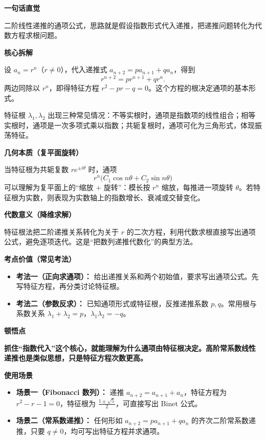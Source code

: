 \begin{explanationbox}
	\textbf{\textcolor{CExplanation}{一句话直觉}}

	二阶线性递推的通项公式，思路就是假设指数形式代入递推，把递推问题转化为代数方程求根问题。

	\medskip
	\textbf{\textcolor{CExplanation}{核心拆解}}
	\begin{description}[style=nextline, leftmargin=2.8em, labelsep=0.5em, itemsep=0.45em]
		\item[\textbf{要点一（指数假设）：}]
		      设 \(a_n=r^n\)（\(r\neq0\)），代入递推式
		      \(a_{n+2}=p a_{n+1}+q a_n\)，得到
		      \[
			      r^{n+2}=p r^{n+1}+q r^n.
		      \]
		      两边同除以 \(r^n\)，即得特征方程 \(r^2-pr-q=0\)。这个方程的根决定通项的基本形式。

		\item[\textbf{要点二（通项结构）：}]
		      特征根 \(\lambda_1,\lambda_2\) 出现三种常见情况：不等实根时，通项是指数项的线性组合；相等实根时，通项是一次多项式乘以指数；共轭复根时，通项可化为三角形式，体现振荡特征。
	\end{description}

	\medskip
	\textbf{\textcolor{CExplanation}{几何本质（复平面旋转）}}

	当特征根为共轭复数 \(re^{\pm i\theta}\) 时，通项
	\[
		r^n\bigl(C_1\cos n\theta+C_2\sin n\theta\bigr)
	\]
	可以理解为复平面上的“缩放 + 旋转”：模长按 \(r^n\) 缩放，每推进一项旋转 \(\theta\)。若特征根为实数，则表现为实数轴上的指数增长、衰减或交替变化。

	\medskip
	\textbf{\textcolor{CExplanation}{代数意义（降维求解）}}

	特征根法把二阶递推关系转化为关于 \(r\) 的二次方程，利用代数求根直接写出通项公式，避免逐项迭代。这是“把数列递推代数化”的典型方法。

	\medskip
	\textbf{\textcolor{CExplanation}{考点价值（常见考法）}}
	\begin{itemize}[leftmargin=*, itemsep=0.5em, topsep=0.4em]
		\item \textbf{考法一（正向求通项）：} 给出递推关系和两个初始值，要求写出通项公式。先写特征方程，再分类讨论特征根。
		\item \textbf{考法二（参数反求）：} 已知通项形式或特征根，反推递推系数 \(p,q\)。常用根与系数关系 \(\lambda_1+\lambda_2=p\)，\(\lambda_1\lambda_2=-q\)。
	\end{itemize}

	\medskip
	\textbf{\textcolor{CExplanation}{顿悟点}}

	\textbf{抓住“指数代入”这个核心，就能理解为什么通项由特征根决定。高阶常系数线性递推也是类似思想，只是特征方程次数更高。}

	\medskip
	\textbf{\textcolor{CExplanation}{使用场景}}
	\begin{itemize}[leftmargin=*, itemsep=0.5em, topsep=0.4em]
		\item \textbf{场景一（Fibonacci 数列）：} 递推 \(a_{n+2}=a_{n+1}+a_n\)，特征方程为 \(r^2-r-1=0\)，特征根为 \(\frac{1\pm\sqrt5}{2}\)，可直接写出 Binet 公式。
		\item \textbf{场景二（常系数递推）：} 任何形如 \(a_{n+2}=p a_{n+1}+q a_n\) 的齐次二阶常系数递推，只要 \(q\neq0\)，均可写出特征方程并求通项。
	\end{itemize}
\end{explanationbox}